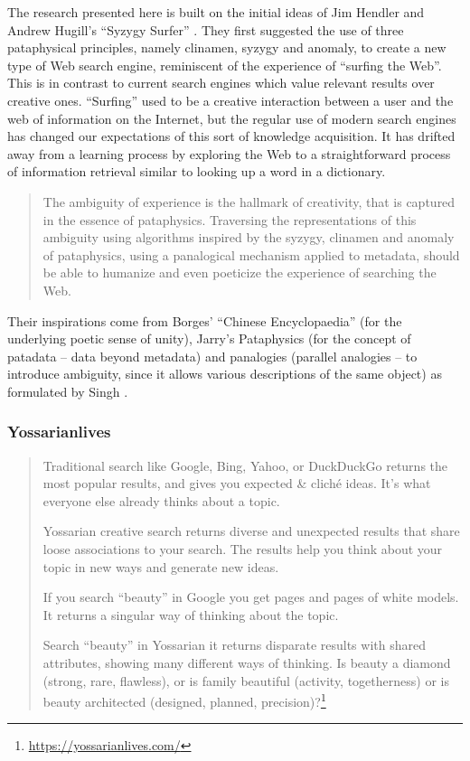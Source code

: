 The research presented here is built on the initial ideas of Jim Hendler and Andrew Hugill's ``Syzygy Surfer'' \autocite{Hendler2011, Hendler2013}. They first suggested the use of three pataphysical principles, namely clinamen, syzygy and anomaly, to create a new type of Web search engine, reminiscent of the experience of ``surfing the Web''. This is in contrast to current search engines which value relevant results over creative ones. ``Surfing'' used to be a creative interaction between a user and the web of information on the Internet, but the regular use of modern search engines has changed our expectations of this sort of knowledge acquisition. It has drifted away from a learning process by exploring the Web to a straightforward process of information retrieval similar to looking up a word in a dictionary.

\begin{quote}
  The ambiguity of experience is the hallmark of creativity, that is captured in the essence of pataphysics. Traversing the representations of this ambiguity using algorithms inspired by the syzygy, clinamen and anomaly of pataphysics, using a panalogical mechanism applied to metadata, should be able to humanize and even poeticize the experience of searching the Web.\autocite{Hendler2013}
\end{quote}

Their inspirations come from Borges' ``Chinese Encyclopaedia'' \autocite{Borges2000} (for the underlying poetic sense of unity), Jarry's Pataphysics \autocite{Jarry1996} (for the concept of patadata – data beyond metadata) and  panalogies (parallel analogies – to introduce ambiguity, since it allows various descriptions of the same object) as formulated by Singh \autocite{Singh2005}.


\subsubsection*{Yossarianlives}

\begin{quote}
  Traditional search like Google, Bing, Yahoo, or DuckDuckGo returns the most popular results, and gives you expected \& cliché ideas. It's what everyone else already thinks about a topic.

  Yossarian creative search returns diverse and unexpected results that share loose associations to your search. The results help you think about your topic in new ways and generate new ideas.

  If you search ``beauty'' in Google you get pages and pages of white models. It returns a singular way of thinking about the topic.

  Search ``beauty'' in Yossarian it returns disparate results with shared attributes, showing many different ways of thinking. Is beauty a diamond (strong, rare, flawless), or is family beautiful (activity, togetherness) or is beauty architected (designed, planned, precision)?\footnote{\url{https://yossarianlives.com/}}
\end{quote}

